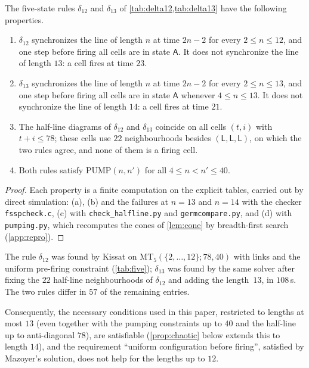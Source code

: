 \begin{theorem}\label{thm:frontier}
The five-state rules $\delta_{12}$ and $\delta_{13}$ of
\cref{tab:delta12,tab:delta13} have the following properties.
\begin{enumerate}[label=(\alph*)]
\item $\delta_{12}$ synchronizes the line of length $n$ at time $2n-2$ for
  every $2\le n\le 12$, and one step before firing all cells are in state
  $\mathsf A$. It does not synchronize the line of length $13$: a cell fires
  at time $23$.
\item $\delta_{13}$ synchronizes the line of length $n$ at time $2n-2$ for
  every $2\le n\le 13$, and one step before firing all cells are in state
  $\mathsf A$ whenever $4\le n\le 13$. It does not synchronize the line of
  length $14$: a cell fires at time $21$.
\item The half-line diagrams of $\delta_{12}$ and $\delta_{13}$ coincide on
  all cells $(t,i)$ with $t+i\le 78$; these cells use $22$ neighbourhoods
  besides $(\mathsf L,\mathsf L,\mathsf L)$, on which the two rules agree, and
  none of them is a firing cell.
\item Both rules satisfy $\mathrm{PUMP}(n,n')$ for all $4\le n<n'\le 40$.
\end{enumerate}
\end{theorem}

\begin{proof}
Each property is a finite computation on the explicit tables, carried out
by direct simulation: (a), (b) and the failures at $n=13$ and $n=14$ with
the checker \texttt{fsspcheck.c}, (c) with \texttt{check\_halfline.py}
and \texttt{germcompare.py}, and (d) with \texttt{pumping.py}, which recomputes the cones of
\cref{lem:cone} by breadth-first search (\ref{app:repro}).
\end{proof}

The rule $\delta_{12}$ was found by Kissat on
$\mathrm{MT}_5(\{2,\dots,12\};78,40)$ with links and the uniform pre-firing
constraint (\cref{tab:five}); $\delta_{13}$ was found by the same solver
after fixing the $22$ half-line neighbourhoods of $\delta_{12}$ and adding
the length~$13$, in $108$\,s. The two rules differ in $57$ of the remaining
entries.

Consequently, the necessary conditions used in this paper,
restricted to lengths at most $13$ (even together with the pumping
constraints up to $40$ and the half-line up to anti-diagonal $78$), are
satisfiable (\cref{prop:chaotic} below extends this to length $14$), and
the requirement ``uniform configuration before firing'', satisfied by
Mazoyer's solution, does not help for the lengths up to $12$.

